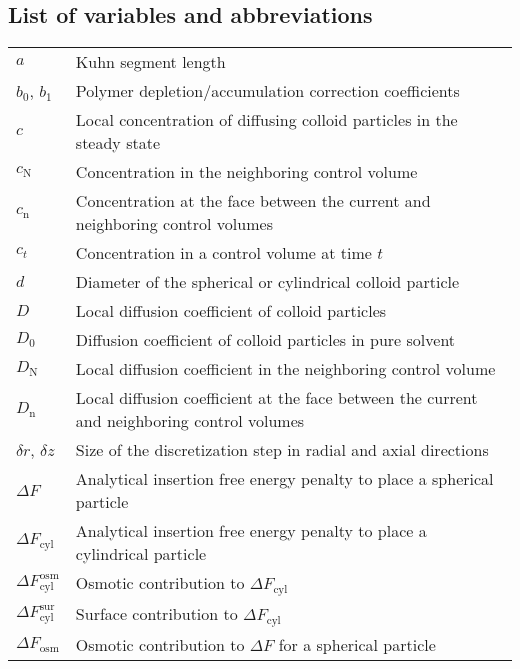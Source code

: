 \documentclass[10pt, a4paper]{article}
\begin{document}
\pagebreak
\subsection*{List of variables and abbreviations}

\begin{tabularx}{\linewidth}{l X}
    $a$ & Kuhn segment length \\
    $b_0$, $b_1$ & Polymer depletion/accumulation correction coefficients \\
    $c$ & Local concentration of diffusing colloid particles in the steady state \\
    $c_{\text{N}}$ & Concentration in the neighboring control volume \\
    $c_{\text{n}}$ & Concentration at the face between the current and neighboring control volumes \\
    $c_{t}$ & Concentration in a control volume at time $t$ \\
    $d$ & Diameter of the spherical or cylindrical colloid particle \\
    $D$ & Local diffusion coefficient of colloid particles \\
    $D_0$ & Diffusion coefficient of colloid particles in pure solvent \\
    $D_{\text{N}}$ & Local diffusion coefficient in the neighboring control volume \\
    $D_{\text{n}}$ & Local diffusion coefficient at the face between the current and neighboring control volumes \\
    $\delta r$, $\delta z$ & Size of the discretization step in radial and axial directions \\
    $\Delta F$ & Analytical insertion free energy penalty to place a spherical particle \\
    $\Delta F_{\text{cyl}}$ & Analytical insertion free energy penalty to place a cylindrical particle \\
    $\Delta F_{\text{cyl}}^{\text{osm}}$ & Osmotic contribution to $\Delta F_{\text{cyl}}$ \\
    $\Delta F_{\text{cyl}}^{\text{sur}}$ & Surface contribution to $\Delta F_{\text{cyl}}$ \\
    $\Delta F_{\text{osm}}$ & Osmotic contribution to $\Delta F$ for a spherical particle\\

\end{tabularx}
\end{document}
